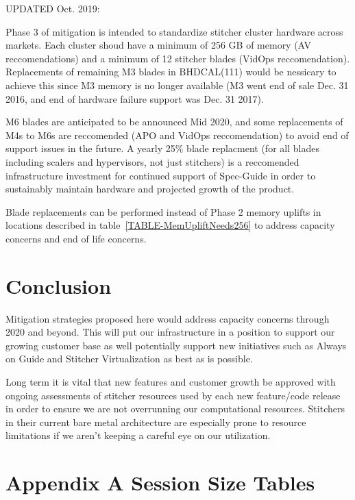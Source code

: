 \documentclass{article}
\begin{document}
UPDATED Oct. 2019:

Phase 3 of mitigation is intended to standardize stitcher cluster hardware across markets. Each cluster shoud have a minimum of 256 GB of memory (AV reccomendations) and a minimum of 12 stitcher blades (VidOps reccomendation). Replacements of remaining M3 blades in BHDCAL(111) would be nessicary to achieve this since M3 memory is no longer available (M3 went end of sale Dec. 31 2016, and end of hardware failure support was Dec. 31 2017). 

M6 blades are anticipated to be announced Mid 2020, and some replacements of M4s to M6s are reccomended (APO and VidOps reccomendation) to avoid end of support issues in the future. A yearly 25\% blade replacment (for all blades including scalers and hypervisors, not just stitchers) is a reccomended infrastructure investment for continued support of Spec-Guide in order to sustainably maintain hardware and projected growth of the product. 

Blade replacements can be performed instead of Phase 2 memory uplifts in locations described in table~\ref{TABLE-MemUpliftNeeds256} to address capacity concerns and end of life concerns. 

\section{Conclusion}
\label{SECTION-Conclusion}

Mitigation strategies proposed here would address capacity concerns through 2020 and beyond. This will put our infrastructure in a position to support our growing customer base as well potentially support new initiatives such as Always on Guide and Stitcher Virtualization as best as is possible.

Long term it is vital that new features and customer growth be approved with ongoing assessments of stitcher resources used by each new feature/code release in order to ensure we are not overrunning our computational resources. Stitchers in their current bare metal architecture are especially prone to resource limitations if we aren't keeping a careful eye on our utilization. 

\newpage

\appendix

\section{Appendix A\: Session Size Tables}
\label{APPENDIX-SessionSizeTables}
\end{document}
